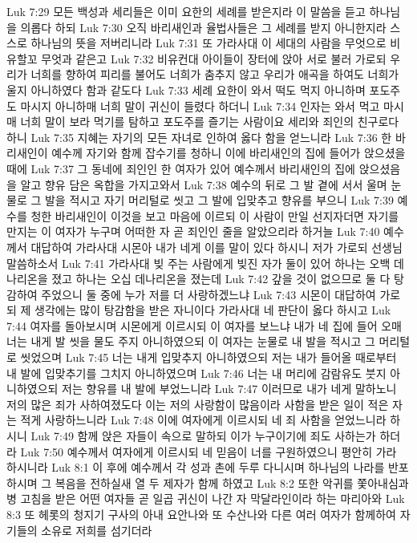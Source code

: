 Luk 7:29  모든 백성과 세리들은 이미 요한의 세례를 받은지라 이 말씀을 듣고 하나님을 의롭다 하되
Luk 7:30  오직 바리새인과 율법사들은 그 세례를 받지 아니한지라 스스로 하나님의 뜻을 저버리니라
Luk 7:31  또 가라사대 이 세대의 사람을 무엇으로 비유할꼬 무엇과 같은고
Luk 7:32  비유컨대 아이들이 장터에 앉아 서로 불러 가로되 우리가 너희를 향하여 피리를 불어도 너희가 춤추지 않고 우리가 애곡을 하여도 너희가 울지 아니하였다 함과 같도다
Luk 7:33  세례 요한이 와서 떡도 먹지 아니하며 포도주도 마시지 아니하매 너희 말이 귀신이 들렸다 하더니
Luk 7:34  인자는 와서 먹고 마시매 너희 말이 보라 먹기를 탐하고 포도주를 즐기는 사람이요 세리와 죄인의 친구로다 하니
Luk 7:35  지혜는 자기의 모든 자녀로 인하여 옳다 함을 얻느니라
Luk 7:36  한 바리새인이 예수께 자기와 함께 잡수기를 청하니 이에 바리새인의 집에 들어가 앉으셨을 때에
Luk 7:37  그 동네에 죄인인 한 여자가 있어 예수께서 바리새인의 집에 앉으셨음을 알고 향유 담은 옥합을 가지고와서
Luk 7:38  예수의 뒤로 그 발 곁에 서서 울며 눈물로 그 발을 적시고 자기 머리털로 씻고 그 발에 입맞추고 향유를 부으니
Luk 7:39  예수를 청한 바리새인이 이것을 보고 마음에 이르되 이 사람이 만일 선지자더면 자기를 만지는 이 여자가 누구며 어떠한 자 곧 죄인인 줄을 알았으리라 하거늘
Luk 7:40  예수께서 대답하여 가라사대 시몬아 내가 네게 이를 말이 있다 하시니 저가 가로되 선생님 말씀하소서
Luk 7:41  가라사대 빚 주는 사람에게 빚진 자가 둘이 있어 하나는 오백 데나리온을 졌고 하나는 오십 데나리온을 졌는데
Luk 7:42  갚을 것이 없으므로 둘 다 탕감하여 주었으니 둘 중에 누가 저를 더 사랑하겠느냐
Luk 7:43  시몬이 대답하여 가로되 제 생각에는 많이 탕감함을 받은 자니이다 가라사대 네 판단이 옳다 하시고
Luk 7:44  여자를 돌아보시며 시몬에게 이르시되 이 여자를 보느냐 내가 네 집에 들어 오매 너는 내게 발 씻을 물도 주지 아니하였으되 이 여자는 눈물로 내 발을 적시고 그 머리털로 씻었으며
Luk 7:45  너는 내게 입맞추지 아니하였으되 저는 내가 들어올 때로부터 내 발에 입맞추기를 그치지 아니하였으며
Luk 7:46  너는 내 머리에 감람유도 붓지 아니하였으되 저는 향유를 내 발에 부었느니라
Luk 7:47  이러므로 내가 네게 말하노니 저의 많은 죄가 사하여졌도다 이는 저의 사랑함이 많음이라 사함을 받은 일이 적은 자는 적게 사랑하느니라
Luk 7:48  이에 여자에게 이르시되 네 죄 사함을 얻었느니라 하시니
Luk 7:49  함께 앉은 자들이 속으로 말하되 이가 누구이기에 죄도 사하는가 하더라
Luk 7:50  예수께서 여자에게 이르시되 네 믿음이 너를 구원하였으니 평안히 가라 하시니라
Luk 8:1  이 후에 예수께서 각 성과 촌에 두루 다니시며 하나님의 나라를 반포하시며 그 복음을 전하실새 열 두 제자가 함께 하였고
Luk 8:2  또한 악귀를 쫓아내심과 병 고침을 받은 어떤 여자들 곧 일곱 귀신이 나간 자 막달라인이라 하는 마리아와
Luk 8:3  또 헤롯의 청지기 구사의 아내 요안나와 또 수산나와 다른 여러 여자가 함께하여 자기들의 소유로 저희를 섬기더라
